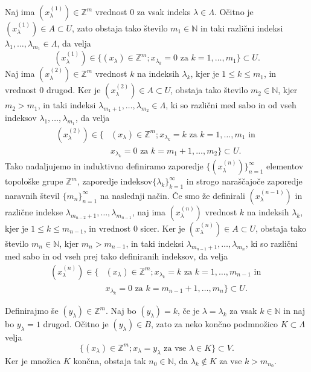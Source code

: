\documentclass[mat1]{fmfdelo}
\newcommand{\N}{\mathbb N}
\newcommand{\Z}{\mathbb Z}
\begin{document}
\begin{dokaz}
Naj ima $(x_\lambda^{(1)}) \in \Z^m$ vrednost $0$ za vsak indeks $\lambda \in \Lambda$. Očitno je $(x_\lambda^{(1)}) \in A \subset U$, zato obstaja tako število $m_1 \in \N$ in taki različni indeksi $\lambda_1,\dots, \lambda_{m_1} \in \Lambda$, da velja
\[ (x_\lambda^{(1)}) \in \lbrace (x_\lambda) \in \Z^m ; x_{\lambda_k} = 0 \text{ za } k=1,\dots,m_1\rbrace \subset U. \]
Naj ima $(x_\lambda^{(2)}) \in \Z^m$ vrednost $k$ na indeksih $\lambda_k$, kjer je $1 \leq k \leq m_1$, in vrednost $0$ drugod. Ker je $(x_\lambda^{(2)}) \in A \subset U$, obstaja tako število $m_2 \in \N$, kjer $m_2 > m_1$, in taki indeksi $\lambda_{m_1+1},\dots,\lambda_{m_2} \in \Lambda$, ki so različni med sabo in od vseh indeksov $\lambda_1,\dots, \lambda_{m_1}$, da velja
\begin{align*}
(x_\lambda^{(2)}) \in \lbrace &(x_\lambda) \in \Z^m ; x_{\lambda_k} = k \text{ za } k=1,\dots,m_1 \text{ in }\\
& x_{\lambda_k} = 0 \text{ za } k = m_1+1,\dots, m_2\rbrace \subset U.
\end{align*}
Tako nadaljujemo in induktivno definiramo zaporedje $\lbrace (x_\lambda^{(n)}) \rbrace_{n = 1}^\infty$ elementov topološke grupe $\Z^m$, zaporedje indeksov$\lbrace\lambda_k\rbrace_{k = 1}^\infty$ in strogo naraščajoče zaporedje naravnih števil $\lbrace m_n \rbrace_{n = 1}^\infty$ na naslednji način. Če smo že definirali $(x_\lambda^{(n-1)})$ in različne indekse $\lambda_{m_{n-2}+1},\dots, \lambda_{m_{n-1}}$, naj ima $(x_\lambda^{(n)})$ vrednost $k$ na indeksih $\lambda_k$, kjer je $1 \leq k \leq m_{n-1}$, in vrednost $0$ sicer. Ker je $(x_\lambda^{(n)}) \in A \subset U$, obstaja tako število $m_n \in \N$, kjer $m_n > m_{n-1}$, in taki indeksi $\lambda_{m_{n-1}+1},\dots,\lambda_{m_n}$, ki so različni med sabo in od vseh prej tako definiranih indeksov, da velja
\begin{align*}
(x_\lambda^{(n)}) \in \lbrace &(x_\lambda) \in \Z^m ; x_{\lambda_k} = k \text{ za } k=1,\dots,m_{n-1} \text{ in }\\
& x_{\lambda_k} = 0 \text{ za } k = m_{n-1}+1,\dots, m_n\rbrace \subset U.
\end{align*}

Definirajmo še $(y_\lambda) \in \Z^m$. Naj bo $(y_\lambda) = k$, če je $\lambda = \lambda_k$ za vsak $k \in \N$ in naj bo $y_\lambda = 1$ drugod. Očitno je $(y_\lambda) \in B$, zato za neko končno podmnožico $K \subset \Lambda$ velja
\[ \lbrace (x_\lambda) \in \Z^m ; x_\lambda = y_\lambda \text{ za vse } \lambda \in K \rbrace \subset V. \]
Ker je množica $K$ končna, obstaja tak $n_0 \in \N$, da $\lambda_k \notin K$ za vse $k > m_{n_0}$.


\end{dokaz}
\end{document}
